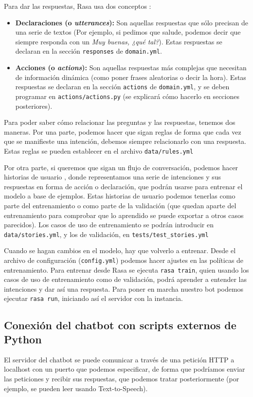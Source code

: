 Para dar las respuestas, Rasa usa dos conceptos \cite{rasa-respuestas}:
\begin{itemize}
	\item \textbf{Declaraciones (o \textit{utterances}):} Son aquellas respuestas que sólo precisan de una serie de textos (Por ejemplo, si pedimos que salude, podemos decir que siempre responda con un \textit{Muy buenas, ¿qué tal?}). Estas respuestas se declaran en la sección \texttt{responses} de \texttt{domain.yml}.
	\item \textbf{Acciones (o \textit{actions}):} Son aquellas respuestas más complejas que necesitan de información dinámica (como poner frases aleatorias o decir la hora). Estas respuestas se declaran en la sección \texttt{actions} de \texttt{domain.yml}, y se deben programar en \texttt{actions/actions.py} (se explicará cómo hacerlo en secciones posteriores).
\end{itemize}

Para poder saber cómo relacionar las preguntas y las respuestas, tenemos dos maneras. Por una parte, podemos hacer que sigan reglas \cite{rasa-rules} de forma que cada vez que se manifieste una intención, debemos siempre relacionarlo con una respuesta. Estas reglas se pueden establecer en el archivo \texttt{data/rules.yml}

Por otra parte, si queremos que sigan un flujo de conversación, podemos hacer historias de usuario \cite{rasa-stories}, donde representamos una serie de intenciones y sus respuestas en forma de acción o declaración, que podrán usarse para entrenar el modelo a base de ejemplos. Estas historias de usuario podemos tenerlas como parte del entrenamiento o como parte de la validación (que quedan aparte del entrenamiento para comprobar que lo aprendido se puede exportar a otros casos parecidos). Los casos de uso de entrenamiento se podrán introducir en \texttt{data/stories.yml}, y los de validación, en \texttt{tests/test\_stories.yml}

Cuando se hagan cambios en el modelo, hay que volverlo a entrenar. Desde el archivo de configuración (\texttt{config.yml}) podemos hacer ajustes en las políticas de entrenamiento.
Para entrenar desde Rasa se ejecuta \texttt{rasa train}, quien usando los casos de uso de entrenamiento como de validación, podrá aprender a entender las intenciones y dar así una respuesta.
Para poner en marcha nuestro bot podemos ejecutar \texttt{rasa run}, iniciando así el servidor con la instancia.



\subsection{Conexión del chatbot con scripts externos de Python}
El servidor del chatbot se puede comunicar a través de una petición HTTP a localhost con un puerto que podemos especificar, de forma que podríamos enviar las peticiones y recibir sus respuestas, que podemos tratar posteriormente (por ejemplo, se pueden leer usando Text-to-Speech).

